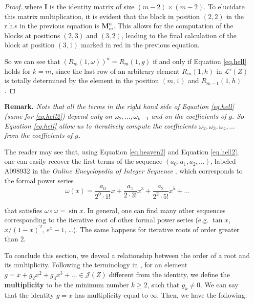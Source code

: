 \documentclass[preprint,12pt]{elsarticle}
\begin{document}
\begin{proof}
\noindent where $\bm I$ is the identity matrix of size $(m-2)\times (m-2)$. To elucidate this matrix multiplication, it is evident that the block in position $(2,2)$ in the r.h.s in the previous equation is $\bm M_{m}^{n}$. This allows for the computation of the blocks at positions $(2,3)$ and $(3,2)$, leading to the final calculation of the block at position $(3,1)$ marked in red in the previous equation. 

So we can see that $(R_m(1,\omega))^n=R_m(1,g)$ if and only if Equation \eqref{eq.hell} holds for $k=m$, since the last row of an arbitrary element $R_m(1,h)$ in $\mathcal L'(Z)$ is totally determined by the element in the position $(m,1)$ and $R_{m-1}(1,h)$. 
\end{proof}



\medskip

\noindent \textbf{Remark.} \emph{Note that all the terms in the right hand side of Equation \eqref{eq.hell} (same for \eqref{eq.hell2})  depend only on $\omega_2,\ldots,\omega_{k-1}$ and on the coefficients of $g$. So Equation \eqref{eq.hell} allow us to iteratively compute the coefficients $\omega_2,\omega_3,\omega_4,\ldots$ from the coefficients of $g$.}



\medskip

The reader may see that, using Equation \eqref{eq.heaven2} and Equation \eqref{eq.hell2}, one can easily recover the first terms of the sequence $(a_0,a_1,a_2,\ldots)$, labeled A098932 in the \emph{Online Encyclopedia of Integer Sequence} \cite{OEIS}, which corresponds to the formal power series
$$\omega(x)=\frac{a_0}{2^0\cdot 1!}x+\frac{a_1}{2\cdot 3!}x^3+\frac{a_2}{2^2\cdot 5!}x^5+\ldots $$

\noindent that satisfies $\omega\circ\omega=\sin x$. In general, one can find many other sequences corresponding to the iterative root of other formal power series (e.g. $\tan x$, $x/(1-x)^2$, $e^x-1$, \ldots). The same happens for iterative roots of order greater than 2.

\medskip

To conclude this section, we deveal a relationship between the order of a root and its multiplicity. Following the terminology in \cite{M}, for an element $g=x+g_2x^2+g_3x^3+\ldots \in\mathcal J(Z)$ different from the identity, we define the \textbf{multiplicity} to be the minimum number $k\geq 2$, such that $g_k\neq 0$. We can say that the identity $g=x$ has multiplicity equal to $\infty$. Then, we have the following:
\end{document}
